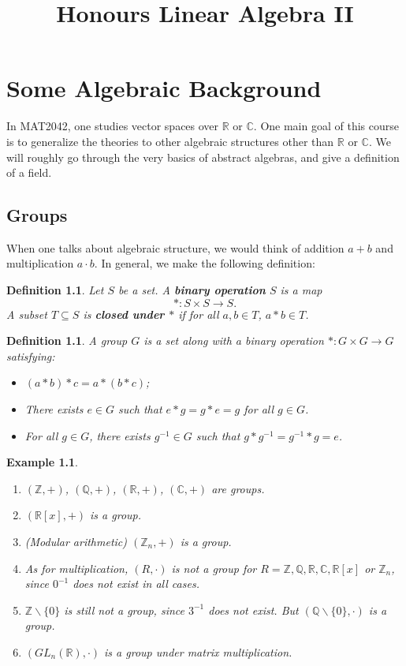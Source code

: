 \documentclass[12pt]{amsbook}
\title{Honours Linear Algebra II}
\newtheorem{definition}[theorem]{Definition}
\newtheorem{example}[theorem]{Example}
\begin{document}
\tableofcontents



\chapter{Some Algebraic Background}
In MAT2042, one studies vector spaces over $\mathbb{R}$ or $\mathbb{C}$. One main goal of this course is to generalize the theories to other algebraic structures other than $\mathbb{R}$ or $\mathbb{C}$. We will roughly go through the very basics of abstract algebras, and give a definition of a field.

\section{Groups}
When one talks about algebraic structure, we would think of addition $a + b$ and multiplication $a \cdot b$. In general, we make the following definition:
\begin{definition}
    Let $S$ be a set. A {\bf binary operation} $S$ is a map
    $$\ast: S \times S \to S.$$
    A subset $T \subseteq S$ is {\bf closed under $\ast$} if for all $a, b \in T$, $a \ast b \in T$.
\end{definition}

\begin{definition} \label{def-group}
    A group $G$ is a set along with a binary operation $\ast: G \times G \to G$ satisfying:
    \begin{itemize}
        \item $(a \ast b) \ast c = a \ast (b \ast c)$;
        \item There exists $e\in G$ such that $e \ast g = g \ast e = g$ for all $g \in G$.
        \item For all $g \in G$, there exists $g^{-1} \in G$ such that $g \ast g^{-1} = g^{-1} \ast g = e$.
    \end{itemize}
\end{definition}

\begin{example}
    \begin{enumerate}
        \item $(\mathbb{Z},+)$, $(\mathbb{Q},+)$, $(\mathbb{R},+)$, $(\mathbb{C},+)$ are groups.
        \item $(\mathbb{R}[x],+)$ is a group.
        \item (Modular arithmetic) $(\mathbb{Z}_n,+)$ is a group.
        \item As for multiplication, $(R,\cdot)$ is not a group for $R = \mathbb{Z}, \mathbb{Q}, \mathbb{R}, \mathbb{C}, \mathbb{R}[x]$ or $\mathbb{Z}_n$, since $0^{-1}$ does not exist in all cases.
        \item $\mathbb{Z} \backslash \{0\}$ is still not a group, since $3^{-1}$ does not exist. But $(\mathbb{Q}\backslash \{0\}, \cdot)$ is a group.
        \item $(GL_n(\mathbb{R}), \cdot)$ is a group under matrix multiplication.
    \end{enumerate}
\end{example}    
\end{document}
